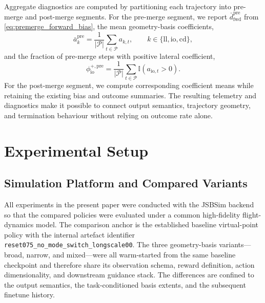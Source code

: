 \documentclass[drones,article,submit,pdftex,moreauthors]{Definitions/mdpi}
\begin{document}
Aggregate diagnostics are computed by partitioning each trajectory into pre-merge and post-merge segments. For the pre-merge segment, we report $\bar{d}_{\mathrm{fwd}}^{\mathrm{pre}}$ from \eqref{eq:premerge_forward_bias}, the mean geometry-basis coefficients,
\begin{equation}
\bar{a}_{k}^{\mathrm{pre}}
=
\frac{1}{|\mathcal{P}|}
\sum_{t \in \mathcal{P}} a_{k,t},
\qquad
k \in \{\mathrm{ll}, \mathrm{io}, \mathrm{cd}\},
\end{equation}
and the fraction of pre-merge steps with positive lateral coefficient,
\begin{equation}
\phi_{\mathrm{io}}^{+,\mathrm{pre}}
=
\frac{1}{|\mathcal{P}|}
\sum_{t \in \mathcal{P}} \mathbb{I}\!\left(a_{\mathrm{io},t} > 0\right).
\end{equation}
For the post-merge segment, we compute corresponding coefficient means while retaining the existing bias and outcome summaries. The resulting telemetry and diagnostics make it possible to connect output semantics, trajectory geometry, and termination behaviour without relying on outcome rate alone.

\section{Experimental Setup}

\subsection{Simulation Platform and Compared Variants}

All experiments in the present paper were conducted with the JSBSim backend so that the compared policies were evaluated under a common high-fidelity flight-dynamics model. The comparison anchor is the established baseline virtual-point policy with the internal artefact identifier \texttt{reset075\_no\_mode\_switch\_longscale00}. The three geometry-basis variants---broad, narrow, and mixed---were all warm-started from the same baseline checkpoint and therefore share its observation schema, reward definition, action dimensionality, and downstream guidance stack. The differences are confined to the output semantics, the task-conditioned basis extents, and the subsequent finetune history.
\end{document}
